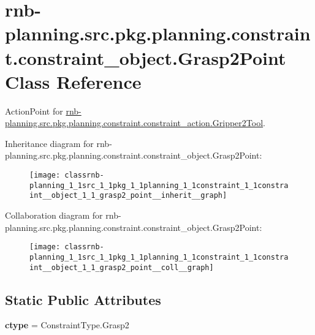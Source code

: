 \hypertarget{classrnb-planning_1_1src_1_1pkg_1_1planning_1_1constraint_1_1constraint__object_1_1_grasp2_point}{}\section{rnb-\/planning.src.\+pkg.\+planning.\+constraint.\+constraint\+\_\+object.\+Grasp2\+Point Class Reference}
\label{classrnb-planning_1_1src_1_1pkg_1_1planning_1_1constraint_1_1constraint__object_1_1_grasp2_point}


Action\+Point for \hyperlink{classrnb-planning_1_1src_1_1pkg_1_1planning_1_1constraint_1_1constraint__action_1_1_gripper2_tool}{rnb-\/planning.\+src.\+pkg.\+planning.\+constraint.\+constraint\+\_\+action.\+Gripper2\+Tool}.  




Inheritance diagram for rnb-\/planning.src.\+pkg.\+planning.\+constraint.\+constraint\+\_\+object.\+Grasp2\+Point\+:\nopagebreak
\begin{figure}[H]
\begin{center}
\leavevmode
\texttt{[image: classrnb-planning\_1\_1src\_1\_1pkg\_1\_1planning\_1\_1constraint\_1\_1constraint\_\_object\_1\_1\_grasp2\_point\_\_inherit\_\_graph]}
\end{center}
\end{figure}


Collaboration diagram for rnb-\/planning.src.\+pkg.\+planning.\+constraint.\+constraint\+\_\+object.\+Grasp2\+Point\+:\nopagebreak
\begin{figure}[H]
\begin{center}
\leavevmode
\texttt{[image: classrnb-planning\_1\_1src\_1\_1pkg\_1\_1planning\_1\_1constraint\_1\_1constraint\_\_object\_1\_1\_grasp2\_point\_\_coll\_\_graph]}
\end{center}
\end{figure}
\subsection*{Static Public Attributes}
\begin{DoxyCompactItemize}
\item 
\mbox{\label{classrnb-planning_1_1src_1_1pkg_1_1planning_1_1constraint_1_1constraint__object_1_1_grasp2_point_ae5898049b41155fd6821c5c28e6392cc}} 
{\bfseries ctype} = Constraint\+Type.\+Grasp2
\end{DoxyCompactItemize}
